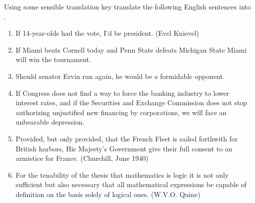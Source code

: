 Using some sensible translation key translate the following English sentences into \GSL{}. 
\begin{enumerate}
	\item If 14-year-olds had the vote, I'd be president. (Evel Knievel)
	\item If Miami beats Cornell today and Penn State defeats Michigan State Miami will win the tournament.
	\item Should senator Ervin run again, he would be a formidable opponent. 
	\item If Congress does not find a way to force the banking industry to lower interest rates, and if the Securities and Exchange Commission does not stop authorizing unjustified new financing by corporations, we will face an unbearable depression. 
	\item Provided, but only provided, that the French Fleet is sailed forthwith for British harbors, His Majesty's Government give their full consent to an armistice for France. (Churchill, June 1940)
	\item For the tenability of the thesis that mathematics is logic it is not only sufficient but also necessary that all mathematical expressions be capable of definition on the basis solely of logical ones. (W.V.O. Quine)
\end{enumerate}


